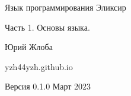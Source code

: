 
\begin{titlepage}
\centering

\vspace{20pt}

\huge{Язык программирования Эликсир}

\huge{Часть 1. Основы языка.}

\vspace{20pt}

\large{Юрий Жлоба}

\vspace{20pt}

\small{yzh44yzh.github.io}

\vspace{20pt}

\small{Версия 0.1.0 Март 2023}

\end{titlepage}

\ClearShipoutPictureBG
